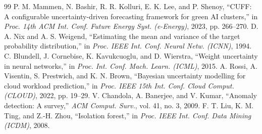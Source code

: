 \documentclass[conference]{IEEEtran}
\begin{document}
\begin{thebibliography}{99}
 P. M. Mammen, N. Bashir, R. R. Kolluri, E. K. Lee, and P. Shenoy, ``CUFF: A configurable uncertainty-driven forecasting framework for green AI clusters,'' in \textit{Proc. 14th ACM Int. Conf. Future Energy Syst. (e-Energy)}, 2023, pp. 266--270.
 D. A. Nix and A. S. Weigend, ``Estimating the mean and variance of the target probability distribution,'' in \textit{Proc. IEEE Int. Conf. Neural Netw. (ICNN)}, 1994.
 C. Blundell, J. Cornebise, K. Kavukcuoglu, and D. Wierstra, ``Weight uncertainty in neural networks,'' in \textit{Proc. Int. Conf. Mach. Learn. (ICML)}, 2015.
 A. Rossi, A. Visentin, S. Prestwich, and K. N. Brown, ``Bayesian uncertainty modelling for cloud workload prediction,'' in \textit{Proc. IEEE 15th Int. Conf. Cloud Comput. (CLOUD)}, 2022, pp. 19--29.
 V. Chandola, A. Banerjee, and V. Kumar, ``Anomaly detection: A survey,'' \textit{ACM Comput. Surv.}, vol. 41, no. 3, 2009.
 F. T. Liu, K. M. Ting, and Z.-H. Zhou, ``Isolation forest,'' in \textit{Proc. IEEE Int. Conf. Data Mining (ICDM)}, 2008.
\end{thebibliography}
\end{document}
